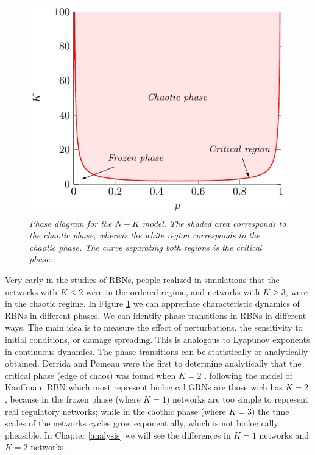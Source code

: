 \begin{figure}[h]
\centering
\includegraphics[scale=1.2]{images/phase-transition.pdf}
\caption{\emph{Phase diagram for the $N-K$ model. The shaded area corresponds
to the chaotic phase, whereas the white region corresponds to the chaotic phase.
The curve separating both regions is the critical phase.}}
\label{fig:ph-tr}
\end{figure}

Very early in the studies of
RBNs, people realized in simulations that the networks with
$K \le 2$ were in the ordered regime, and networks with $K \ge 3$,
were in the chaotic regime. In Figure \ref{fig:ph-tr} we can appreciate
characteristic dynamics of RBNs in different phases.
We can identify phase transitions in RBNs in different
ways. The main idea is to measure the effect of perturbations, the sensitivity to initial conditions, or damage spreading. This is analogous to Lyapunov exponents in continuous
dynamics.
The phase transitions can be statistically or analytically
obtained. Derrida and Pomeau were the first to determine
analytically that the critical phase (edge of chaos) was found
when $K = 2$ \cite{K8}\cite{K17}\cite{K21}.
following the model of Kauffman, RBN which most represent biological GRNs are those wich has $K=2$ \cite{K6}, because in the frozen phase (where $K=1$) networks are too simple to represent real regulatory networks; while in the caothic phase (where $K=3$) the time scales of the networks cycles grow exponentially, which is not biologically pheasible.
In Chapter \ref{analysis} we will see the differences in $K=1$ networks and $K=2$ networks.

